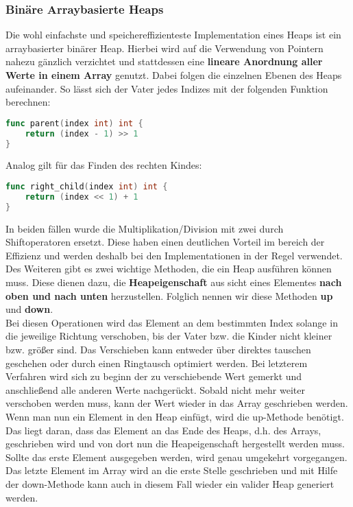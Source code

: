 \documentclass{article}
\begin{document}
\subsubsection{Binäre Arraybasierte Heaps}
Die wohl einfachste und speichereffizienteste Implementation eines Heaps ist ein arraybasierter binärer Heap. Hierbei wird auf die Verwendung von Pointern nahezu gänzlich verzichtet und stattdessen eine \textbf{lineare Anordnung aller Werte in einem Array} genutzt. Dabei folgen die einzelnen Ebenen des Heaps aufeinander. So lässt sich der Vater jedes Indizes mit der folgenden Funktion berechnen:
\begin{lstlisting}[language=go]
func parent(index int) int {
    return (index - 1) >> 1
}
\end{lstlisting}
Analog gilt für das Finden des rechten Kindes:
\begin{lstlisting}[language=go]
func right_child(index int) int {
    return (index << 1) + 1
}
\end{lstlisting}
In beiden fällen wurde die Multiplikation/Division mit zwei durch Shiftoperatoren ersetzt. Diese haben einen deutlichen Vorteil im bereich der Effizienz und werden deshalb bei den Implementationen in der Regel verwendet.\\
Des Weiteren gibt es zwei wichtige Methoden, die ein Heap ausführen können muss. Diese dienen dazu, die \textbf{Heapeigenschaft} aus sicht eines Elementes \textbf{nach oben und nach unten} herzustellen. Folglich nennen wir diese Methoden \textbf{up} und \textbf{down}.\\
Bei diesen Operationen wird das Element an dem bestimmten Index solange in die jeweilige Richtung verschoben, bis der Vater bzw. die Kinder nicht kleiner bzw. größer sind. Das Verschieben kann entweder über direktes tauschen geschehen oder durch einen Ringtausch optimiert werden. Bei letzterem Verfahren wird sich zu beginn der zu verschiebende Wert gemerkt und anschließend alle anderen Werte nachgerückt. Sobald nicht mehr weiter verschoben werden muss, kann der Wert wieder in das Array geschrieben werden.\\
Wenn man nun ein Element in den Heap einfügt, wird die up-Methode benötigt. Das liegt daran, dass das Element an das Ende des Heaps, d.h. des Arrays, geschrieben wird und von dort nun die Heapeigenschaft hergestellt werden muss. Sollte das erste Element ausgegeben werden, wird genau umgekehrt vorgegangen. Das letzte Element im Array wird an die erste Stelle geschrieben und mit Hilfe der down-Methode kann auch in diesem Fall wieder ein valider Heap generiert werden.\\
\end{document}
